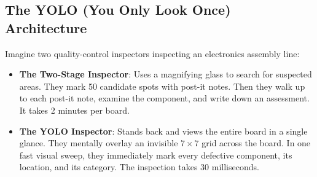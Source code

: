 \subsection{The YOLO (You Only Look Once) Architecture}\label{subsec:yolo}

\begin{analogy}
Imagine two quality-control inspectors inspecting an electronics assembly line:
\begin{itemize}
    \item \textbf{The Two-Stage Inspector}: Uses a magnifying glass to search for suspected areas. They mark 50 candidate spots with post-it notes. Then they walk up to each post-it note, examine the component, and write down an assessment. It takes 2 minutes per board.
    \item \textbf{The YOLO Inspector}: Stands back and views the entire board in a single glance. They mentally overlay an invisible $7 \times 7$ grid across the board. In one fast visual sweep, they immediately mark every defective component, its location, and its category. The inspection takes 30 milliseconds.
\end{itemize}
\end{analogy}

